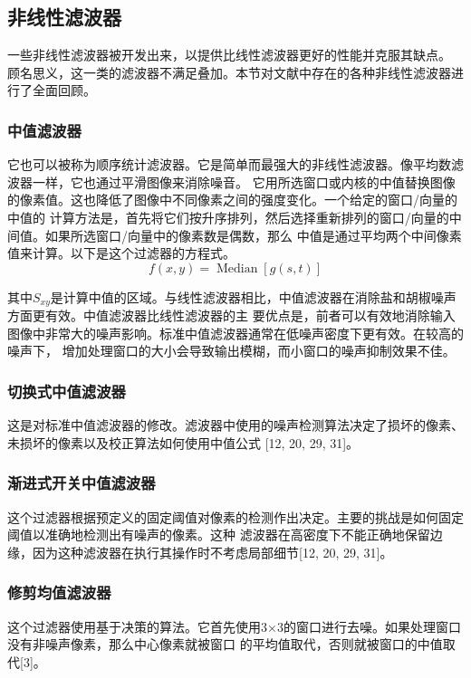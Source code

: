 \documentclass[12pt]{article} %
\begin{document}
\subsection{非线性滤波器}
一些非线性滤波器\cite{ref2,ref3,ref4,ref7,ref10,ref11,ref12,ref16,ref18,ref19,ref20,ref29,ref31}被开发出来，以提供比线性滤波器更好的性能并克服其缺点。
顾名思义，这一类的滤波器不满足叠加。本节对文献中存在的各种非线性滤波器进行了全面回顾。

\subsubsection{中值滤波器}
它也可以被称为顺序统计滤波器。它是简单而最强大的非线性滤波器。像平均数滤波器一样，它也通过平滑图像来消除噪音。
它用所选窗口或内核的中值替换图像的像素值。这也降低了图像中不同像素之间的强度变化。一个给定的窗口/向量的中值的
计算方法是，首先将它们按升序排列，然后选择重新排列的窗口/向量的中间值。如果所选窗口/向量中的像素数是偶数，那么
中值是通过平均两个中间像素值来计算。以下是这个过滤器的方程式。
\begin{equation}
    f(x, y)=\operatorname{Median}[g(s, t)]
\end{equation}

其中$S_{xy}$是计算中值的区域。与线性滤波器相比，中值滤波器在消除盐和胡椒噪声方面更有效。中值滤波器比线性滤波器的主
要优点是，前者可以有效地消除输入图像中非常大的噪声影响。标准中值滤波器通常在低噪声密度下更有效。在较高的噪声下，
增加处理窗口的大小会导致输出模糊，而小窗口的噪声抑制效果不佳。

\subsubsection{切换式中值滤波器}
这是对标准中值滤波器的修改。滤波器中使用的噪声检测算法决定了损坏的像素、未损坏的像素以及校正算法如何使用中值公式
[12, 20, 29, 31]。

\subsubsection{渐进式开关中值滤波器}
这个过滤器根据预定义的固定阈值对像素的检测作出决定。主要的挑战是如何固定阈值以准确地检测出有噪声的像素。这种
滤波器在高密度下不能正确地保留边缘，因为这种滤波器在执行其操作时不考虑局部细节[12, 20, 29, 31]。

\subsubsection{修剪均值滤波器}
这个过滤器使用基于决策的算法。它首先使用3×3的窗口进行去噪。如果处理窗口没有非噪声像素，那么中心像素就被窗口
的平均值取代，否则就被窗口的中值取代[3]。
\end{document}
